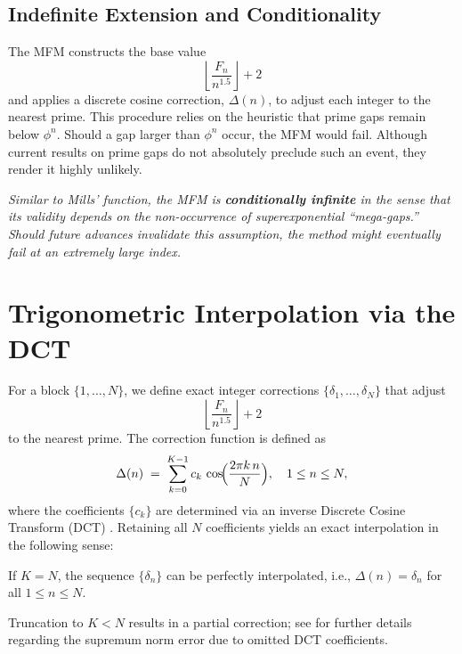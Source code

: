 \documentclass[12pt]{article}
\begin{document}
\subsection{Indefinite Extension and Conditionality}
The MFM constructs the base value
\[
\left\lfloor \frac{F_n}{n^{1.5}} \right\rfloor + 2
\]
and applies a discrete cosine correction, $\Delta(n)$, to adjust each integer to the nearest prime. This procedure relies on the heuristic that prime gaps remain below $\phi^n$. Should a gap larger than $\phi^n$ occur, the MFM would fail. Although current results on prime gaps do not absolutely preclude such an event, they render it highly unlikely.

\begin{remark}
\emph{Similar to Mills’ function, the MFM is \textbf{conditionally infinite} in the sense that its validity depends on the non-occurrence of superexponential “mega-gaps.” Should future advances invalidate this assumption, the method might eventually fail at an extremely large index.}
\end{remark}

\section{Trigonometric Interpolation via the DCT}

For a block $\{1,\dots,N\}$, we define exact integer corrections $\{\delta_1,\dots,\delta_N\}$ that adjust
\[
\left\lfloor \frac{F_n}{n^{1.5}} \right\rfloor + 2
\]
to the nearest prime. The correction function is defined as
\[
  \Delta(n) \;=\; \sum_{k=0}^{K-1} c_k\,\cos\!\Bigl(\frac{2\pi k\,n}{N}\Bigr),\quad 1\le n\le N,
\]
where the coefficients $\{c_k\}$ are determined via an inverse Discrete Cosine Transform (DCT) \cite{AhmedNatarajanRao,RaoYip}. Retaining all $N$ coefficients yields an exact interpolation in the following sense:

\begin{theorem}[Exactness with $K=N$]
If $K=N$, the sequence $\{\delta_n\}$ can be perfectly interpolated, i.e., $\Delta(n)=\delta_n$ for all $1\le n\le N$.
\end{theorem}

Truncation to $K<N$ results in a partial correction; see \cite{HardyWright} for further details regarding the supremum norm error due to omitted DCT coefficients.
\end{document}
